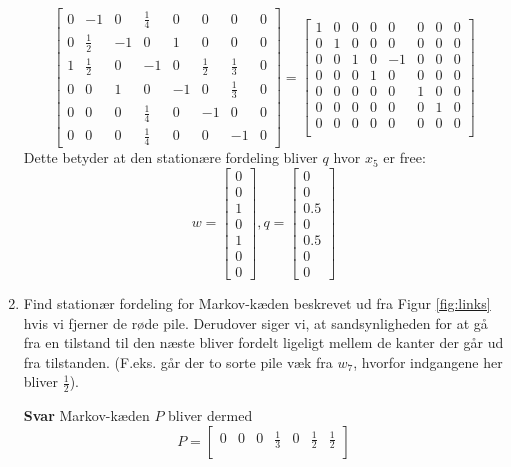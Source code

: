\documentclass[10pt,a4paper]{article}
\begin{document}
\begin{enumerate}
\[\begin{bmatrix}
		0 & -1 & 0 & \frac{1}{4} & 0 & 0 & 0 & 0 \\
		0 & \frac{1}{2} & -1 & 0 & 1 & 0 & 0 & 0 \\
		1 & \frac{1}{2} & 0 & -1 & 0 & \frac{1}{2} & \frac{1}{3} & 0\\
		0 & 0 & 1 & 0 & -1 & 0 & \frac{1}{3} & 0\\
		0 & 0 & 0 & \frac{1}{4} & 0 & -1 & 0 & 0\\
		0 & 0 & 0 & \frac{1}{4} & 0 & 0 & -1 & 0
	\end{bmatrix}
	=
	\begin{bmatrix}
		1 & 0 & 0 & 0 & 0 & 0 & 0 & 0 \\
		0 & 1 & 0 & 0 & 0 & 0 & 0 & 0 \\
		0 & 0 & 1 & 0 & -1 & 0 & 0 & 0 \\
		0 & 0 & 0 & 1 & 0 & 0 & 0 & 0 \\
		0 & 0 & 0 & 0 & 0 & 1 & 0 & 0 \\
		0 & 0 & 0 & 0 & 0 & 0 & 1 & 0 \\
		0 & 0 & 0 & 0 & 0 & 0 & 0 & 0 \\
	\end{bmatrix}
	\]
	Dette betyder at den stationære fordeling bliver $q$ hvor $x_5$ er free:
	\[w=\begin{bmatrix} 0\\0\\1\\0\\1\\0\\0\end{bmatrix},q=\begin{bmatrix} 0\\0\\0.5\\0\\0.5\\0\\0\end{bmatrix}\]
	\item Find stationær fordeling for Markov-kæden beskrevet ud fra Figur \ref{fig:links} hvis vi fjerner de røde pile. Derudover siger vi, at sandsynligheden for at gå fra en tilstand til den næste bliver fordelt ligeligt mellem de kanter der går ud fra tilstanden. (F.eks. går der to sorte pile væk fra $w_7$, hvorfor indgangene her bliver $\frac{1}{2}$).
	\item[\textbf{Svar}] Markov-kæden $P$ bliver dermed
	\[
	P=\begin{bmatrix}
		0 & 0 & 0 & \frac{1}{3} & 0 & \frac{1}{2} & \frac{1}{2} \\

\end{bmatrix}\]
\end{enumerate}
\end{document}
